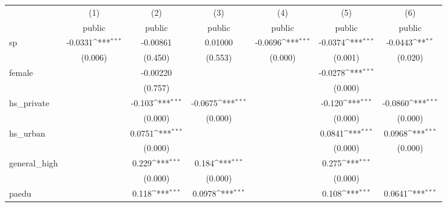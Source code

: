 {
\def\sym#1{\ifmmode^{#1}\else\(^{#1}\)\fi}
\begin{tabular}{l*{6}{c}}
\hline\hline
            &\multicolumn{1}{c}{(1)}&\multicolumn{1}{c}{(2)}&\multicolumn{1}{c}{(3)}&\multicolumn{1}{c}{(4)}&\multicolumn{1}{c}{(5)}&\multicolumn{1}{c}{(6)}\\
            &\multicolumn{1}{c}{public}&\multicolumn{1}{c}{public}&\multicolumn{1}{c}{public}&\multicolumn{1}{c}{public}&\multicolumn{1}{c}{public}&\multicolumn{1}{c}{public}\\
\hline
sp          &     -0.0331\sym{***}&    -0.00861         &     0.01000         &     -0.0696\sym{***}&     -0.0374\sym{***}&     -0.0443\sym{**} \\
            &     (0.006)         &     (0.450)         &     (0.553)         &     (0.000)         &     (0.001)         &     (0.020)         \\
[1em]
female      &                     &    -0.00220         &                     &                     &     -0.0278\sym{***}&                     \\
            &                     &     (0.757)         &                     &                     &     (0.000)         &                     \\
[1em]
hs\_private  &                     &      -0.103\sym{***}&     -0.0675\sym{***}&                     &      -0.120\sym{***}&     -0.0860\sym{***}\\
            &                     &     (0.000)         &     (0.000)         &                     &     (0.000)         &     (0.000)         \\
[1em]
hs\_urban    &                     &      0.0751\sym{***}&                     &                     &      0.0841\sym{***}&      0.0968\sym{***}\\
            &                     &     (0.000)         &                     &                     &     (0.000)         &     (0.000)         \\
[1em]
general\_high&                     &       0.229\sym{***}&       0.184\sym{***}&                     &       0.275\sym{***}&                     \\
            &                     &     (0.000)         &     (0.000)         &                     &     (0.000)         &                     \\
[1em]
paedu       &                     &       0.118\sym{***}&      0.0978\sym{***}&                     &       0.108\sym{***}&      0.0641\sym{***}\\

\end{tabular}}
